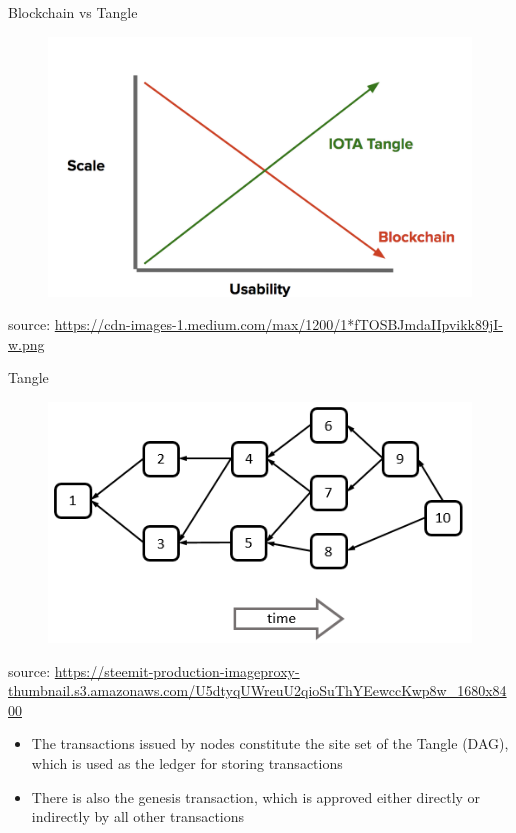 \documentclass[9pt]{beamer}
\begin{document}
\begin{frame}{Blockchain vs Tangle}
	\begin{figure}[]
		\centering
		\includegraphics  [scale=0.2]{Images/tanglevsblock}
	\end{figure}
	\begin{scriptsize}
		source: \href{https://blog.iota.org/a-primer-on-iota-with-presentation-e0a6eb2cc621}{https://cdn-images-1.medium.com/max/1200/1*fTOSBJmdaIIpvikk89jI-w.png}
	\end{scriptsize}
\end{frame}


\begin{frame}{Tangle}
	\begin{figure}[]
		\centering
		\includegraphics  [scale=0.35]{Images/iota-dag}
	\end{figure}
	\begin{scriptsize}
		source: \href{https://steemkr.com/iota/@wolfofcrypto/iota-is-it-worth-one-iota}{https://steemit-production-imageproxy-thumbnail.s3.amazonaws.com/U5dtyqUWreuU2qioSuThYEewccKwp8w\_1680x8400}
	\end{scriptsize}
	\begin{itemize}
		\item The transactions issued by nodes constitute the site set of the Tangle (DAG), which is used as the ledger for storing transactions
		\item There is also the genesis transaction, which is approved either directly or indirectly by all other transactions
	\end{itemize}
\end{frame}
\end{document}
